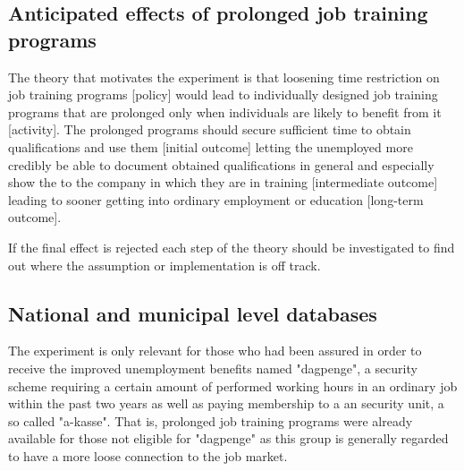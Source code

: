 \subsection{Anticipated effects of prolonged job training programs}
\label{subsec:theory}
The theory that motivates the experiment is %
that loosening time restriction on job training programs [policy] would lead to individually designed job training programs that are prolonged only when individuals are likely to benefit from it [activity]. The prolonged programs should secure sufficient time to obtain qualifications and use them [initial outcome] letting the unemployed more credibly be able to document obtained qualifications in general and especially show the to the company in which they are in training [intermediate outcome] leading to sooner getting into ordinary employment or education [long-term outcome].

If the final effect is rejected each step of the theory should be investigated to find out where the assumption or implementation is off track.


\subsection{National and municipal level databases}
\label{subsec:data}
The experiment is only relevant for those who had been assured in order to receive the improved unemployment benefits named "dagpenge", a security scheme requiring a certain amount of performed working hours in an ordinary job within the past two years as well as paying membership to a an security unit, a so called "a-kasse". That is, prolonged job training programs were already available for those not eligible for "dagpenge" as this group is generally regarded to have a more loose connection to the job market.

